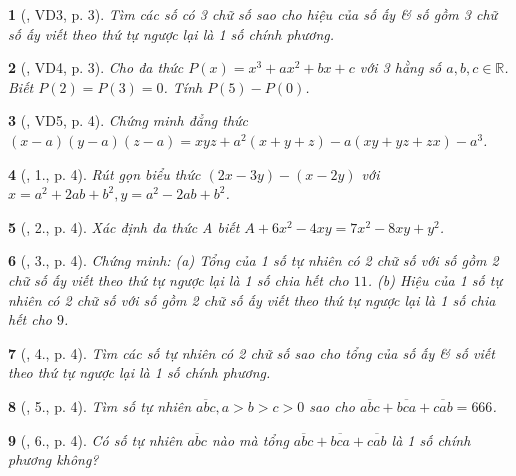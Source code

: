 \documentclass{article}
\newtheorem{baitoan}{}
\begin{document}
\begin{baitoan}[\cite{Binh_Toan_8_tap_1}, VD3, p. 3]
	Tìm các số có 3 chữ số sao cho hiệu của số ấy \& số gồm 3 chữ số ấy viết theo thứ tự ngược lại là 1 số chính phương.
\end{baitoan}

\begin{baitoan}[\cite{Binh_Toan_8_tap_1}, VD4, p. 3]
	Cho đa thức $P(x) = x^3 + ax^2 + bx + c$ với 3 hằng số $a,b,c\in\mathbb{R}$. Biết $P(2) = P(3) = 0$. Tính $P(5) - P(0)$.
\end{baitoan}

\begin{baitoan}[\cite{Binh_Toan_8_tap_1}, VD5, p. 4]
	Chứng minh đẳng thức $(x - a)(y - a)(z - a) = xyz + a^2(x + y + z) - a(xy + yz + zx) - a^3$.
\end{baitoan}

\begin{baitoan}[\cite{Binh_Toan_8_tap_1}, 1., p. 4]
	Rút gọn biểu thức $(2x - 3y) - (x - 2y)$ với $x = a^2 + 2ab + b^2,y = a^2 - 2ab + b^2$.
\end{baitoan}

\begin{baitoan}[\cite{Binh_Toan_8_tap_1}, 2., p. 4]
	Xác định đa thức A biết $A + 6x^2 - 4xy = 7x^2 - 8xy + y^2$.
\end{baitoan}

\begin{baitoan}[\cite{Binh_Toan_8_tap_1}, 3., p. 4]
	Chứng minh: (a) Tổng của 1 số tự nhiên có 2 chữ số với số gồm 2 chữ số ấy viết theo thứ tự ngược lại là 1 số chia hết cho $11$. (b) Hiệu của 1 số tự nhiên có 2 chữ số với số gồm 2 chữ số ấy viết theo thứ tự ngược lại là 1 số chia hết cho $9$.
\end{baitoan}

\begin{baitoan}[\cite{Binh_Toan_8_tap_1}, 4., p. 4]
	Tìm các số tự nhiên có 2 chữ số sao cho tổng của số ấy \& số viết theo thứ tự ngược lại là 1 số chính phương.
\end{baitoan}

\begin{baitoan}[\cite{Binh_Toan_8_tap_1}, 5., p. 4]
	Tìm số tự nhiên $\overline{abc},a > b > c > 0$ sao cho $\overline{abc} + \overline{bca} + \overline{cab} = 666$.
\end{baitoan}

\begin{baitoan}[\cite{Binh_Toan_8_tap_1}, 6., p. 4]
	Có số tự nhiên $\overline{abc}$ nào mà tổng $\overline{abc} + \overline{bca} + \overline{cab}$ là 1 số chính phương không?
\end{baitoan}
\end{document}
